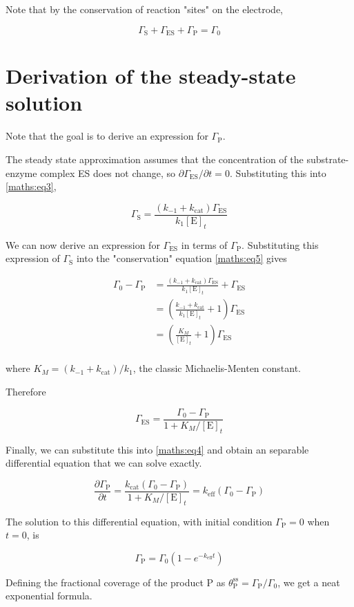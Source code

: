 \documentclass{article}
\newcommand{\pd}[2]{\frac{\partial #1}{\partial #2}}
\newcommand{\GS}{\Gamma_\text{S}}
\newcommand{\GES}{\Gamma_{\text{ES}}}
\newcommand{\GP}{\Gamma_{\text{P}}}
\newcommand{\Et}{[\text{E}]_t}
\newcommand{\kcat}{k_{\text{cat}}}
\begin{document}
Note that by the conservation of reaction "sites" on the electrode, 

\begin{equation}
    \GS + \GES + \GP = \Gamma_0
    \label{maths:eq5}
\end{equation}

\section{Derivation of the steady-state solution} \label{section:4}

Note that the goal is to derive an expression for $\GP$.

The steady state approximation assumes that the concentration of the substrate-enzyme complex ES does not change, so $\partial \GES / \partial t = 0$. Substituting this into \eqref{maths:eq3}, 

\[
\GS = \frac{(k_{-1} + \kcat) \GES}{k_1 \Et}
\]

We can now derive an expression for $\GES$ in terms of $\GP$. Substituting this expression of $\GS$ into the "conservation" equation \eqref{maths:eq5} gives

\begin{align*}
    \Gamma_0 - \GP &= \frac{(k_{-1} + \kcat) \GES}{k_1 \Et} + \GES \\[5pt]
    &= \left( \frac{k_{-1} + \kcat}{k_1 \Et} + 1\right) \GES \\[6pt]
    &= \left( \frac{K_M}{\Et} + 1 \right) \GES \\
\end{align*}

where $K_M = (k_{-1} + \kcat) / k_1$, the classic Michaelis-Menten constant.

Therefore

\[\GES = \frac{\Gamma_0 - \GP}{1 + K_M / \Et}\]

Finally, we can substitute this into \eqref{maths:eq4} and obtain an separable differential equation that we can solve exactly.

\[ 
\pd{\GP}{t} = \frac{\kcat (\Gamma_0 - \GP)}{1 + K_M / \Et} = k_{\text{eff}} (\Gamma_0 - \GP) 
\]

The solution to this differential equation, with initial condition $\GP = 0$ when $t = 0$, is 

\[
\GP = \Gamma_0 \left( 1 - e^{-k_{\text{eff}} t} \right)
\]

Defining the fractional coverage of the product P as $\theta^{\text{ss}}_{\text{P}} = \GP / \Gamma_0$, we get a neat exponential formula. \cite{annedemaille12}
\end{document}
